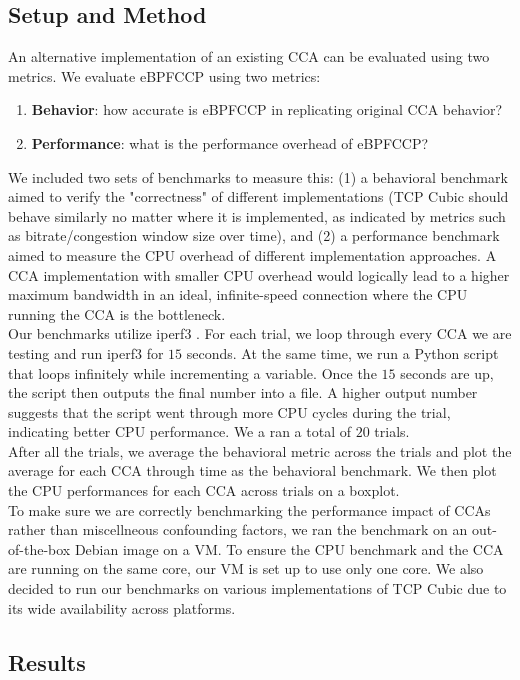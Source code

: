 \documentclass[../main.tex]{subfiles}
\begin{document}
\subsection{Setup and Method}
An alternative implementation of an existing CCA can be evaluated using two metrics.
We evaluate eBPFCCP using two metrics:
\begin{enumerate}
    \item {\bf Behavior}: how accurate is eBPFCCP in replicating original CCA behavior?
    \item {\bf Performance}: what is the performance overhead of eBPFCCP?
\end{enumerate}

We included two sets of benchmarks to measure this: (1) a behavioral benchmark aimed to verify the "correctness" of different implementations (TCP Cubic should behave similarly no matter where it is implemented, as indicated by metrics such as bitrate/congestion window size over time), and (2) a performance benchmark aimed to measure the CPU overhead of different implementation approaches. A CCA implementation with smaller CPU overhead would logically lead to a higher maximum bandwidth in an ideal, infinite-speed connection where the CPU running the CCA is the bottleneck. \\
Our benchmarks utilize iperf3 \cite{iperf}. For each trial, we loop through every CCA we are testing and run iperf3 for $15$ seconds. At the same time, we run a Python script that loops infinitely while incrementing a variable. Once the $15$ seconds are up, the script then outputs the final number into a file. A higher output number suggests that the script went through more CPU cycles during the trial, indicating better CPU performance. We a ran a total of $20$ trials. \\
After all the trials, we average the behavioral metric across the trials and plot the average for each CCA through time as the behavioral benchmark. We then plot the CPU performances for each CCA across trials on a boxplot. \\
To make sure we are correctly benchmarking the performance impact of CCAs rather than miscellneous confounding factors, we ran the benchmark on an out-of-the-box Debian image on a VM. To ensure the CPU benchmark and the CCA are running on the same core, our VM is set up to use only one core. We also decided to run our benchmarks on various implementations of TCP Cubic due to its wide availability across platforms.

\subsection{Results}
\end{document}
